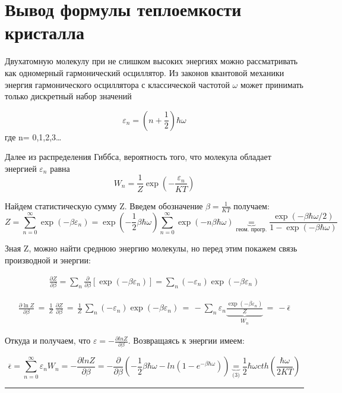 \documentclass[a4paper]{article}
\begin{document}
\section{Вывод формулы теплоемкости кристалла}

Двухатомную молекулу при не слишком высоких энергиях можно рассматривать как одномерный гармонический осциллятор.
Из законов квантовой механики энергия гармонического осциллятора с классической частотой $\omega $ может принимать только дискретный набор значений
 
\[\varepsilon_{n} = (n+\frac{1}{2})\hbar \omega\]
где n= 0,1,2,3\dots \par
Далее из распределения Гиббса, вероятность того, что молекула обладает энергией $\varepsilon_{n}$ равна
\[W_{n}=\frac{1}{Z}\exp(-\frac{\varepsilon_{n}}{KT})\]

Найдем статистическую сумму Z. Введем обозначение $\beta =\frac{1}{KT}$ получаем:
\[Z= \sum_{n = 0}^{\infty} \exp(-\beta \varepsilon_{n})=\exp(-\frac{1}{2} \beta \hbar \omega)\sum_{n = 0}^{\infty} \exp(-n\beta \hbar\omega)\underbrace{=}_{\text{геом. прогр.}} \frac{\exp(-\beta \hbar \omega/2)}{1-\exp(-\beta \hbar \omega)}\]

Зная Z, можно найти среднюю энергию молекулы, но перед этим покажем связь производной и энергии:

\begin{align*}
\frac{\partial Z}{\partial \beta} = \sum_n \frac{\partial}{\partial \beta} [\exp(-\beta \varepsilon_n)] = \sum_n (-\varepsilon_n) \exp(-\beta \varepsilon_n)
\end{align*}

\begin{align*}
\frac{\partial \ln Z}{\partial \beta} \,=\, \frac{1}{Z}\,\frac{\partial Z}{\partial \beta}\,=\,\frac{1}{Z}\,\sum_n (-\varepsilon_n) \exp(-\beta \varepsilon_n)\,=\, -\sum_n \varepsilon_n \underbrace{\frac{\exp(-\beta \varepsilon_n)}{Z}}_{W_n}\,=\, - \bar{\epsilon}
\end{align*}

Откуда и получаем, что $\varepsilon =-\frac{\partial lnZ}{\partial \beta}$. Возвращаясь к энергии имеем:

\[\overline{\epsilon}= \sum_{n = 0}^{\infty} \varepsilon_{n}W_{n} = -\frac{\partial lnZ}{\partial \beta}=-\frac{\partial}{\partial \beta}(-\frac{1}{2}\beta \hbar \omega - ln(1-e^{-\beta \hbar \omega}))\underbrace{=}_{\text{(3)}} \frac{1}{2}\hbar \omega cth(\frac{\hbar \omega}{2KT})\]  

\rule{0.5\linewidth}{0.4pt}
\end{document}
